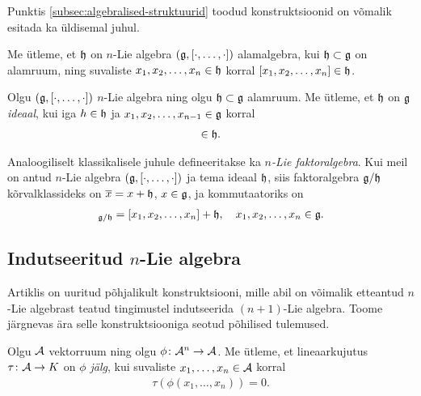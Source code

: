 Punktis \ref{subsec:algebralised-struktuurid} toodud konstruktsioonid
on võmalik esitada ka üldisemal juhul.

\begin{dfn}
    Me ütleme, et $\mathfrak{h}$ on $n$-Lie algebra $(\mathfrak{g}, [\cdot, \dots, \cdot])$
    alamalgebra, kui $\mathfrak{h} \subset \mathfrak{g}$ on alamruum, ning suvaliste
    $x_1, x_2, \dots, x_n \in \mathfrak{h}$ korral $[x_1, x_2, \dots, x_n] \in \mathfrak{h}$.
\end{dfn}

\begin{dfn}
    Olgu $(\mathfrak{g}, [\cdot, \dots, \cdot])$ $n$-Lie algebra ning olgu
    $\mathfrak{h} \subset \mathfrak{g}$ alamruum. Me ütleme, et $\mathfrak{h}$ on $\mathfrak{g}$ \emph{ideaal}, kui
    iga $h \in \mathfrak{h}$ ja $x_1, x_2, \dots, x_{n-1} \in \mathfrak{g}$ korral
    \begin{align*}
        [h, x_1, x_2, \dots, x_{n-1}] \in \h.
    \end{align*}
\end{dfn}

Analoogiliselt klassikalisele juhule defineeritakse ka
\emph{$n$-Lie faktoralgebra}.
Kui meil on antud $n$-Lie algebra $(\mathfrak{g}, [\cdot, \dots, \cdot])$ ja tema
ideaal $\mathfrak{h}$, siis faktoralgebra $\mathfrak{g}/\mathfrak{h}$ kõrvalklassideks on
$\overline{x} = x + \mathfrak{h}$, $x \in \mathfrak{g}$, ja kommutaatoriks on
\begin{align*}
    [x_1 + \h, x_2 + \h, \dots, x_n + \h]_{\g/\h} =
    [x_1, x_2, \dots, x_n] + \h,\quad
    x_1, x_2, \dots, x_n \in \g.
\end{align*}

\subsection{Indutseeritud \texorpdfstring{$n$}\ -Lie algebra}

Artiklis \cite{AKMS:2014} on uuritud põhjalikult konstruktsiooni, mille
abil on võimalik etteantud $n$-Lie algebrast teatud tingimustel indutseerida
$(n+1)$-Lie algebra. Toome järgnevas ära selle konstruktsiooniga seotud
põhilised tulemused.

\begin{dfn}[Jälg]
    Olgu $\mathcal{A}$ vektorruum ning olgu $\phi \colon \mathcal{A}^n \to \mathcal{A}$. Me
    ütleme, et lineaarkujutus $\tau \colon \mathcal{A} \to K$ on
    \emph{$\phi$ jälg}, kui suvaliste $x_1, \dots, x_n \in \mathcal{A}$
    korral
    \begin{align*}
        \tau \left(
            \phi \left( x_1, \dots, x_n \right)
        \right) = 0.
    \end{align*}
\end{dfn}

